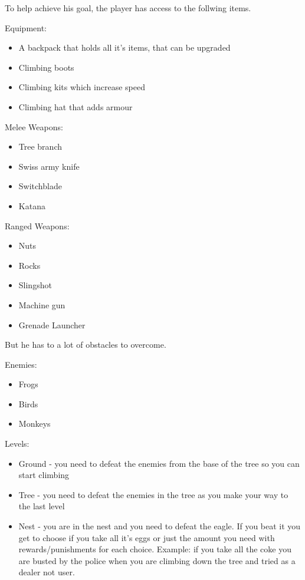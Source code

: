 \documentclass[12p]{article}
\begin{document}
To help achieve his goal, the player has access to the follwing items.

Equipment:
\begin{itemize}
  \item A backpack that holds all it’s items, that can be upgraded 
  \item Climbing boots
  \item Climbing kits which increase speed
  \item Climbing hat that adds armour
\end{itemize}

Melee Weapons:
\begin{itemize}
  \item Tree branch 
  \item Swiss army knife
  \item Switchblade
  \item Katana
\end{itemize}

Ranged Weapons:
\begin{itemize}
  \item Nuts
  \item Rocks
  \item Slingshot
  \item Machine gun
  \item Grenade Launcher
\end{itemize}

But he has to a lot of obstacles to overcome.

Enemies:
\begin{itemize}
  \item Frogs
  \item Birds
  \item Monkeys
\end{itemize}

Levels:
\begin{itemize}
  \item Ground - you need to defeat the enemies from the base of the tree so you can start climbing
  \item Tree - you need to defeat the enemies in the tree as you make your way to the last level
  \item Nest - you are in the nest and you need to defeat the eagle. If you beat it you get to choose if you take all it’s eggs or just the amount you need with rewards/punishments for each choice. Example: if you take all the coke you are busted by the police when you are climbing down the tree and tried as a dealer not user.
\end{itemize}
\end{document}
